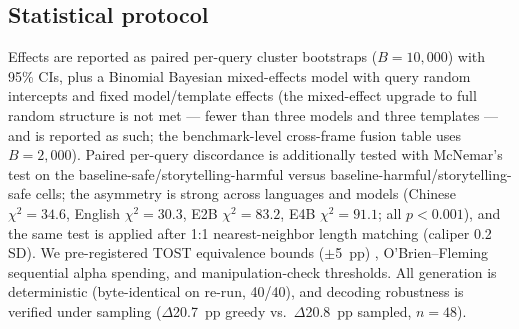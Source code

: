 \subsection{Statistical protocol}
Effects are reported as paired per-query cluster bootstraps \citep{efron1993}
($B=10{,}000$) with
95\% CIs, plus a Binomial Bayesian mixed-effects model \citep{bates2015} with
query random
intercepts and fixed model/template effects (the mixed-effect upgrade to full
random structure is not met --- fewer than three models and three templates ---
and is reported as such; the benchmark-level cross-frame fusion table uses
$B=2{,}000$). Paired per-query discordance is additionally tested with
McNemar's test \citep{mcnemar1947} on the baseline-safe/storytelling-harmful
versus
baseline-harmful/storytelling-safe cells; the asymmetry is strong across
languages and models (Chinese $\chi^2{=}34.6$, English $\chi^2{=}30.3$, E2B
$\chi^2{=}83.2$, E4B $\chi^2{=}91.1$; all $p<0.001$), and the same test is
applied after 1:1 nearest-neighbor length matching (caliper 0.2 SD). We
pre-registered TOST equivalence bounds ($\pm$5~pp) \citep{lakens2018},
O'Brien--Fleming sequential
alpha spending, and manipulation-check thresholds.
All generation is deterministic (byte-identical on re-run, 40/40), and decoding
robustness is verified under sampling ($\Delta$20.7~pp greedy vs.\
$\Delta$20.8~pp sampled, $n=48$).
